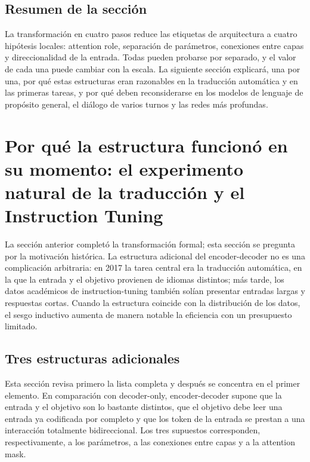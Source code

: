 \documentclass[a4paper]{article}
\begin{document}

\subsection{Resumen de la sección}

La transformación en cuatro pasos reduce las etiquetas de arquitectura a cuatro hipótesis locales: attention role, separación de parámetros, conexiones entre capas y direccionalidad de la entrada. Todas pueden probarse por separado, y el valor de cada una puede cambiar con la escala. La siguiente sección explicará, una por una, por qué estas estructuras eran razonables en la traducción automática y en las primeras tareas, y por qué deben reconsiderarse en los modelos de lenguaje de propósito general, el diálogo de varios turnos y las redes más profundas.
\section{Por qué la estructura funcionó en su momento: el experimento natural de la traducción y el Instruction Tuning}

La sección anterior completó la transformación formal; esta sección se pregunta por la motivación histórica. La estructura adicional del encoder-decoder no es una complicación arbitraria: en 2017 la tarea central era la traducción automática, en la que la entrada y el objetivo provienen de idiomas distintos; más tarde, los datos académicos de instruction-tuning también solían presentar entradas largas y respuestas cortas. Cuando la estructura coincide con la distribución de los datos, el sesgo inductivo aumenta de manera notable la eficiencia con un presupuesto limitado.

\subsection{Tres estructuras adicionales}

Esta sección revisa primero la lista completa y después se concentra en el primer elemento. En comparación con decoder-only, encoder-decoder supone que la entrada y el objetivo son lo bastante distintos, que el objetivo debe leer una entrada ya codificada por completo y que los token de la entrada se prestan a una interacción totalmente bidireccional. Los tres supuestos corresponden, respectivamente, a los parámetros, a las conexiones entre capas y a la attention mask.
\end{document}
